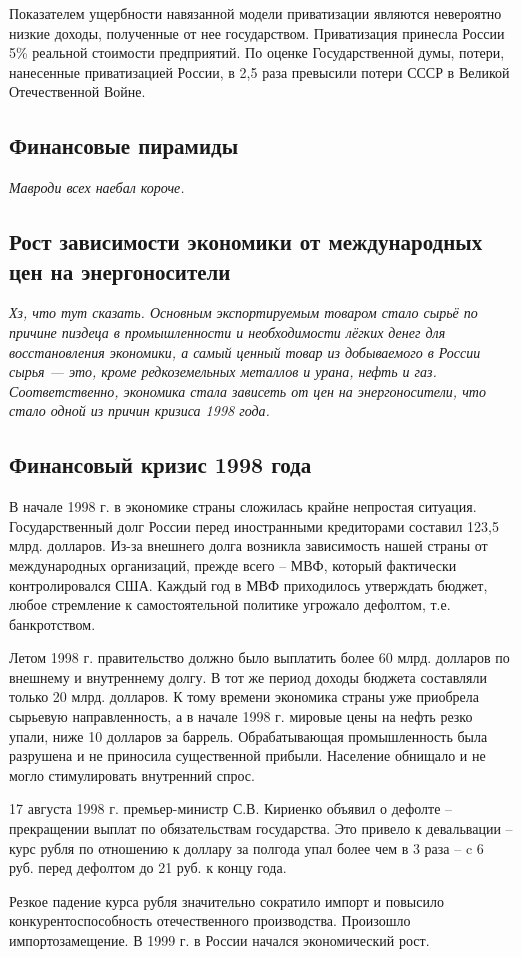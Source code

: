 Показателем ущербности навязанной модели приватизации являются невероятно низкие доходы, полученные от нее государством. Приватизация принесла России 5\% реальной стоимости предприятий. По оценке Государственной думы, потери, нанесенные приватизацией России, в 2,5 раза превысили потери СССР в Великой Отечественной Войне.


\subsection{Финансовые пирамиды}
{\it Мавроди всех наебал короче.}

\subsection{Рост зависимости экономики от международных цен на энергоносители}
{\it Хз, что тут сказать. Основным экспортируемым товаром стало сырьё по причине пиздеца в промышленности и необходимости лёгких денег для восстановления экономики, а самый ценный товар из добываемого в России сырья --- это, кроме редкоземельных металлов и урана, нефть и газ. Соответственно, экономика стала зависеть от цен на энергоносители, что стало одной из причин кризиса 1998 года.}

\subsection{Финансовый кризис 1998 года}
В начале 1998 г. в экономике страны сложилась крайне непростая ситуация. Государственный долг России перед иностранными кредиторами составил 123,5 млрд. долларов. Из-за внешнего долга возникла зависимость нашей страны от международных организаций, прежде всего – МВФ, который фактически контролировался США. Каждый год в МВФ приходилось утверждать бюджет, любое стремление к самостоятельной политике угрожало дефолтом, т.е. банкротством.

Летом 1998 г. правительство должно было выплатить более 60 млрд. долларов по внешнему и внутреннему долгу. В тот же период доходы бюджета составляли только 20 млрд. долларов. К тому времени экономика страны уже приобрела сырьевую направленность, а в начале 1998 г. мировые цены на нефть резко упали, ниже 10 долларов за баррель. Обрабатывающая промышленность была разрушена и не приносила существенной прибыли. Население обнищало и не могло стимулировать внутренний спрос.

17 августа 1998 г. премьер-министр С.В. Кириенко объявил о дефолте – прекращении выплат по обязательствам государства. Это привело к девальвации – курс рубля по отношению к доллару за полгода упал более чем в 3 раза – c 6 руб. перед дефолтом до 21 руб. к концу года.

Резкое падение курса рубля значительно сократило импорт и повысило конкурентоспособность отечественного производства. Произошло импортозамещение. В 1999 г. в России начался экономический рост.
